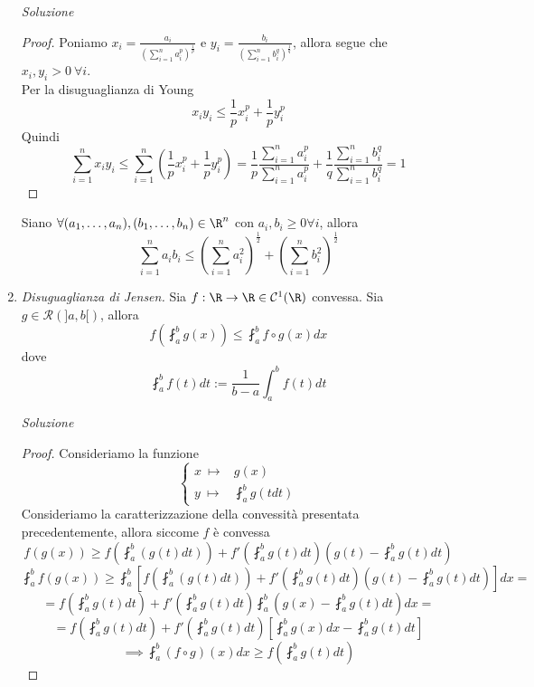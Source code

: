\documentclass{article}
\begin{document}
\begin{enumerate}[label=\textbf{Esercizio 12.\arabic*.},itemindent=*]
\item[\textit{\large Soluzione~}]~

\begin{proof}
   Poniamo $x_i=\frac{a_i}{\left(\sum\limits_{i=1}^na_i^p\right)^{\frac{1}{p}}}$ e $y_i=\frac{b_i}{\left(\sum\limits_{i=1}^nb_i^q\right)^{\frac{1}{q}}}$, allora segue che $x_i,y_i>0~\forall i$.
   \\Per la disuguaglianza di Young
   \[x_iy_i\leq \frac{1}{p}x_i^p+\frac{1}{p}y_i^p\]
   Quindi 
   \[\sum\limits_{i=1}^nx_iy_i\leq\sum\limits_{i=1}^n\left( \frac{1}{p}x_i^p+\frac{1}{p}y_i^p\right)=\frac{1}{p}\frac{\sum\limits_{i=1}^na_i^p}{\sum\limits_{i=1}^na_i^p}+\frac{1}{q}\frac{\sum\limits_{i=1}^nb_i^q}{\sum\limits_{i=1}^nb_i^q}=1\]
\end{proof}

\begin{corollary*}
    Siano $\forall (a_1, \dots, a_n), (b_1,\dots, b_n)\in \R^n$ con $a_i, b_i\geq 0\forall i$, allora  
    \[\sum_{i=1}^n a_ib_i\leq \left(\sum_{i=1}^na_i^2\right)^{\frac{1}{2}}+\left(\sum_{i=1}^nb_i^2\right)^{\frac{1}{2}}\]
\end{corollary*}

\item \textit{Disuguaglianza di Jensen.} Sia $f:\R\to\R\in \mathcal{C}^1(\R)$ convessa. Sia $g\in \mathcal{R}(]a,b[)$, allora 
\[f\left( \fint_a^b g(x) \right)\leq \fint _a^bf\circ g(x)dx\] 
dove
\[\fint_a^bf(t)dt:=\frac{1}{b-a}\int _a^bf(t)dt\]

\item[\textit{\large Soluzione~}]~

\begin{proof}
    Consideriamo la funzione \[\begin{cases}
        x~\longmapsto &g(x)\\
        y~\longmapsto &\fint_a^bg(tdt)
    \end{cases}\]
   Consideriamo la caratterizzazione della convessità presentata precedentemente, allora siccome $f$ è convessa
   \[f(g(x))\geq f\left(\fint_a^b(g(t)dt)\right)+f'\left(\fint_a^bg(t)dt\right)\left( g(t)-\fint _a^bg(t)dt \right)\]
   \[\fint_a^bf(g(x))\geq\fint _a^b\left[f\left(\fint_a^b(g(t)dt)\right)+f'\left(\fint_a^bg(t)dt\right)\left( g(t)-\fint _a^bg(t)dt \right)\right]dx=\]
   \[=f\left(\fint_a^bg(t)dt\right)+f'\left( \fint_a^bg(t)dt \right)\fint _a^b\left( g(x)-\fint _a^bg(t)dt \right)dx=\]
   \[=f\left(\fint_a^bg(t)dt\right)+f'\left( \fint_a^bg(t)dt \right)\left[ \fint_a^bg(x)dx-\fint_a^bg(t)dt \right]\]
   \[\implies \fint _a^b(f\circ g)(x)dx\geq f(\fint _a^bg(t)dt)\]
\end{proof}


\end{enumerate}
\end{document}
